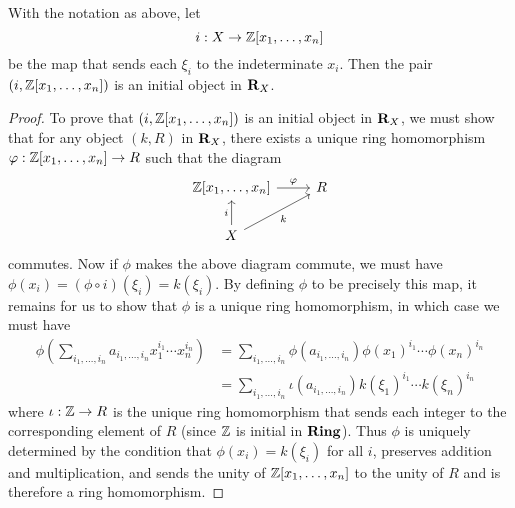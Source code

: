\begin{theorem}
    With the notation as above, let \[i: X \to \mathbb{Z}[x_1, \ldots, x_n]\] be the map
    that sends each \(\xi_i\) to the indeterminate \(x_i\). Then the pair \((i,
    \mathbb{Z}[x_1, \ldots, x_n])\) is an initial object in \(\mathbf{R}_X\).
\end{theorem}

\begin{proof}
    To prove that \((i, \mathbb{Z}[x_1, \ldots, x_n])\) is an initial object in
    \(\mathbf{R}_X\), we must show that for any object \((k, R)\) in
    \(\mathbf{R}_X\), there exists a unique ring homomorphism \(\varphi: \mathbb{Z}[x_1,
    \ldots, x_n] \to R\) such that the diagram
    \[
        \begin{tikzcd}
            \Z[x_1, \ldots, x_n] \ar[r, "\phi"] & R\\
            X \ar[u, "i"] \ar[ur, "k"']
        \end{tikzcd}
    \]
    commutes. Now if \(\phi\) makes the above diagram commute, we must have
    \(\phi(x_i) = (\phi \circ i)(\xi_i) = k(\xi_i)\). By defining \(\phi\) to be
    precisely this map, it remains for us to show that \(\phi\) is a unique ring
    homomorphism, in which case we must have
    \begin{align*}
        \phi\left(\sum_{i_1, \ldots, i_n} a_{i_1, \ldots, i_n} x_1^{i_1} \cdots x_n^{i_n}\right) &= \sum_{i_1, \ldots, i_n} \phi(a_{i_1, \ldots, i_n}) \phi(x_1)^{i_1} \cdots \phi(x_n)^{i_n}\\
        &= \sum_{i_1, \ldots, i_n} \iota(a_{i_1, \ldots, i_n}) k(\xi_1)^{i_1} \cdots k(\xi_n)^{i_n}
    \end{align*}
    where \(\iota: \mathbb{Z} \to R\) is the unique ring homomorphism that sends each
    integer to the corresponding element of \(R\) (since \(\mathbb{Z}\) is initial in
    \(\mathbf{Ring}\)). Thus \(\phi\) is uniquely determined by the condition that
    \(\phi(x_i) = k(\xi_i)\) for all \(i\), preserves addition and
    multiplication, and sends the unity of \(\mathbb{Z}[x_1, \ldots, x_n]\) to the unity
    of \(R\) and is therefore a ring homomorphism.
\end{proof}


